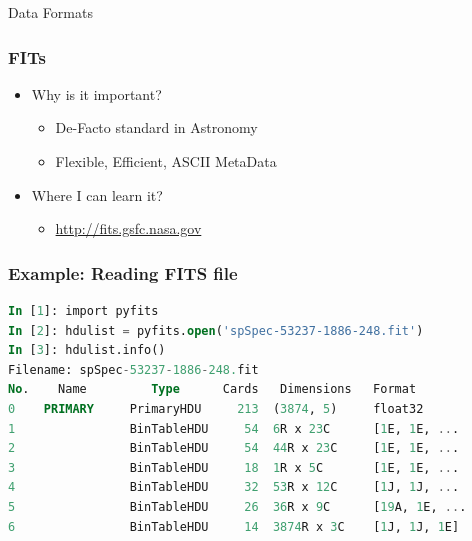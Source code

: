 \documentclass[fleqn]{beamer}
\begin{document}
\begin{section}{Data Formats}

  \begin{frame}\frametitle{FITs}
  \begin{itemize}
    \item{Why is it important?}
      \begin{itemize}
      \item De-Facto standard in Astronomy
      \item Flexible, Efficient, ASCII MetaData
      \end{itemize}
    \item{Where I can learn it?}
      \begin{itemize}
      \item \url{http://fits.gsfc.nasa.gov}
      \end{itemize}
  \end{itemize}
  \end{frame}

\begin{frame}[containsverbatim]\frametitle{Example: Reading FITS file}
\begin{lstlisting}[language=SQL]
In [1]: import pyfits
In [2]: hdulist = pyfits.open('spSpec-53237-1886-248.fit')
In [3]: hdulist.info()
Filename: spSpec-53237-1886-248.fit
No.    Name         Type      Cards   Dimensions   Format
0    PRIMARY     PrimaryHDU     213  (3874, 5)     float32
1                BinTableHDU     54  6R x 23C      [1E, 1E, ...
2                BinTableHDU     54  44R x 23C     [1E, 1E, ...
3                BinTableHDU     18  1R x 5C       [1E, 1E, ...
4                BinTableHDU     32  53R x 12C     [1J, 1J, ...
5                BinTableHDU     26  36R x 9C      [19A, 1E, ...
6                BinTableHDU     14  3874R x 3C    [1J, 1J, 1E]
\end{lstlisting}
\end{frame}





\end{section}
\end{document}

